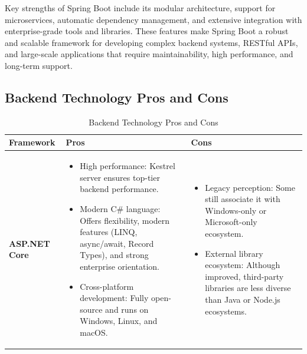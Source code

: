 Key strengths of Spring Boot include its modular architecture, support for microservices, automatic dependency management, and extensive integration with enterprise-grade tools and libraries. These features make Spring Boot a robust and scalable framework for developing complex backend systems, RESTful APIs, and large-scale applications that require maintainability, high performance, and long-term support.

\subsection{Backend Technology Pros and Cons}

\clearpage 

\begin{longtable}{|l|p{6cm}|p{6cm}|}
\caption{Backend Technology Pros and Cons} \\
\hline
\textbf{Framework} & \textbf{Pros} & \textbf{Cons} \\
\hline

\textbf{ASP.NET Core} &
\begin{itemize}[leftmargin=*,noitemsep,nolistsep]
    \item High performance: Kestrel server ensures top-tier backend performance.
    \item Modern C\# language: Offers flexibility, modern features (LINQ, async/await, Record Types), and strong enterprise orientation.
    \item Cross-platform development: Fully open-source and runs on Windows, Linux, and macOS.
\end{itemize} &
\begin{itemize}[leftmargin=*,noitemsep,nolistsep]
    \item Legacy perception: Some still associate it with Windows-only or Microsoft-only ecosystem.
    \item External library ecosystem: Although improved, third-party libraries are less diverse than Java or Node.js ecosystems.
\end{itemize} \\
\hline


\end{longtable}

